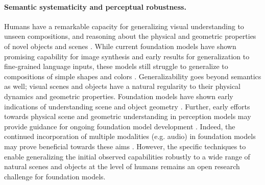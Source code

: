 \paragraph{Semantic systematicity and perceptual robustness.} Humans have a remarkable capacity for generalizing visual understanding to unseen compositions, and reasoning about the physical and geometric properties of novel objects and scenes \cite{lake2015human}. While current foundation models have shown promising capability for image synthesis and early results for generalization to fine-grained language inputs, these models still struggle to generalize to compositions of simple shapes and colors \cite{ramesh2021zeroshot,radford2021learning,rong2021extrapolating}. Generalizability goes beyond semantics as well; visual scenes and objects have a natural regularity to their physical dynamics and geometric properties. Foundation models have shown early indications of understanding scene and object geometry \cite{ramesh2021zeroshot}. Further, early efforts towards physical scene and geometric understanding in perception models may provide guidance for ongoing foundation model development \cite{yi2019clevrer, bakhtin2019phyre, li2020visual}. Indeed, the continued incorporation of multiple modalities (e.g. audio) in foundation models may prove beneficial towards these aims \cite{zhang2017shape,gao2020visualechoes,jaegle2021perceiverio}. However, the specific techniques to enable generalizing the initial observed capabilities robustly to a wide range of natural scenes and objects at the level of humans remains an open research challenge for foundation models.

